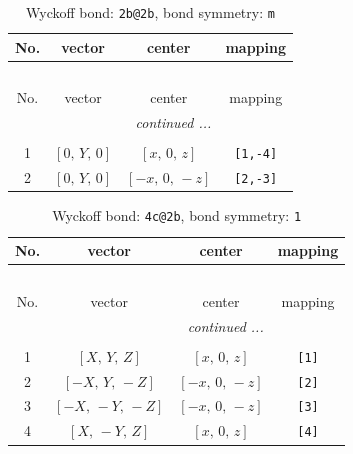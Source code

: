 \documentclass[fleqn,8pt]{jsarticle}
\begin{document}
\renewcommand{\arraystretch}{1.2}
\begin{longtable}{cccc}
\caption{Wyckoff bond: {\tt 2b@2b}, bond symmetry: {\tt m}}
 \\
 \hline \hline
No. & vector & center & mapping \\ \hline \endfirsthead

\multicolumn{3}{l}{\tablename\ \thetable{}} \\
 \hline \hline
No. & vector & center & mapping \\ \hline \endhead

 \hline \hline
\multicolumn{3}{r}{\footnotesize\it continued ...} \\ \endfoot

 \hline \hline
\multicolumn{3}{r}{} \\ \endlastfoot

1 & $\left[ 0,\, Y,\, 0 \right]$ & $\left[ x,\, 0,\, z \right]$ & {\tt [1,-4]} \\ \hline
2 & $\left[ 0,\, Y,\, 0 \right]$ & $\left[ - x,\, 0,\, - z \right]$ & {\tt [2,-3]} \\
\end{longtable}
\renewcommand{\arraystretch}{1.2}
\begin{longtable}{cccc}
\caption{Wyckoff bond: {\tt 4c@2b}, bond symmetry: {\tt 1}}
 \\
 \hline \hline
No. & vector & center & mapping \\ \hline \endfirsthead

\multicolumn{3}{l}{\tablename\ \thetable{}} \\
 \hline \hline
No. & vector & center & mapping \\ \hline \endhead

 \hline \hline
\multicolumn{3}{r}{\footnotesize\it continued ...} \\ \endfoot

 \hline \hline
\multicolumn{3}{r}{} \\ \endlastfoot

1 & $\left[ X,\, Y,\, Z \right]$ & $\left[ x,\, 0,\, z \right]$ & {\tt [1]} \\ \hline
2 & $\left[ - X,\, Y,\, - Z \right]$ & $\left[ - x,\, 0,\, - z \right]$ & {\tt [2]} \\ \hline
3 & $\left[ - X,\, - Y,\, - Z \right]$ & $\left[ - x,\, 0,\, - z \right]$ & {\tt [3]} \\ \hline
4 & $\left[ X,\, - Y,\, Z \right]$ & $\left[ x,\, 0,\, z \right]$ & {\tt [4]} \\
\end{longtable}
\end{document}
